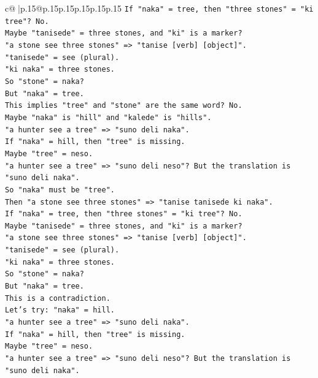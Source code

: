 \documentclass{article}
\begin{document}
{\begin{supertabular}{c@{$\;$}|p{.15\linewidth}@{}p{.15\linewidth}p{.15\linewidth}p{.15\linewidth}p{.15\linewidth}p{.15\linewidth}}
{{{\texttt{If "naka" = tree, then "three stones" = "ki tree"? No.} \\
\texttt{Maybe "tanisede" = three stones, and "ki" is a marker?} \\
\texttt{"a stone see three stones" => "tanise {[}verb{]} {[}object{]}".} \\
\texttt{"tanisede" = see (plural).} \\
\texttt{"ki naka" = three stones.} \\
\texttt{So "stone" = naka?} \\
\texttt{But "naka" = tree.} \\
\texttt{This implies "tree" and "stone" are the same word? No.} \\
\texttt{Maybe "naka" is "hill" and "kalede" is "hills".} \\
\texttt{"a hunter see a tree" => "suno deli naka".} \\
\texttt{If "naka" = hill, then "tree" is missing.} \\
\texttt{Maybe "tree" = neso.} \\
\texttt{"a hunter see a tree" => "suno deli neso"? But the translation is "suno deli naka".} \\
\texttt{So "naka" must be "tree".} \\
\texttt{Then "a stone see three stones" => "tanise tanisede ki naka".} \\
\texttt{If "naka" = tree, then "three stones" = "ki tree"? No.} \\
\texttt{Maybe "tanisede" = three stones, and "ki" is a marker?} \\
\texttt{"a stone see three stones" => "tanise {[}verb{]} {[}object{]}".} \\
\texttt{"tanisede" = see (plural).} \\
\texttt{"ki naka" = three stones.} \\
\texttt{So "stone" = naka?} \\
\texttt{But "naka" = tree.} \\
\texttt{This is a contradiction.} \\
\texttt{Let's try: "naka" = hill.} \\
\texttt{"a hunter see a tree" => "suno deli naka".} \\
\texttt{If "naka" = hill, then "tree" is missing.} \\
\texttt{Maybe "tree" = neso.} \\
\texttt{"a hunter see a tree" => "suno deli neso"? But the translation is "suno deli naka".} \\
}}}
\end{supertabular}}
\end{document}
